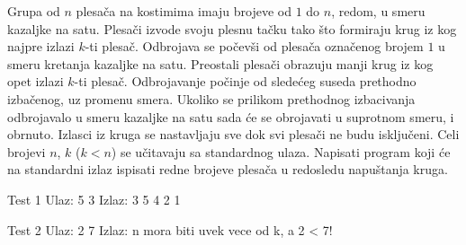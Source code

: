 \begin{Exercise}[label=613]
Grupa od $n$ plesača na kostimima imaju brojeve od $1$ do $n$, redom, u smeru kazaljke na satu.
Plesači izvode svoju plesnu tačku tako što formiraju krug iz kog najpre izlazi $k$-ti plesač.
Odbrojava se počevši od plesača označenog brojem $1$ u smeru kretanja kazaljke na satu. 
Preostali plesači obrazuju manji krug iz kog opet izlazi $k$-ti plesač. Odbrojavanje počinje od
sledećeg suseda prethodno izbačenog, uz promenu smera. Ukoliko se prilikom prethodnog izbacivanja odbrojavalo 
u smeru kazaljke na satu sada će se obrojavati u suprotnom smeru, i obrnuto. Izlasci iz kruga se nastavljaju
sve dok svi plesači ne budu isključeni. 
Celi brojevi $n$, $k$ ($k < n$) se učitavaju sa standardnog ulaza. 
Napisati program koji će na standardni izlaz ispisati redne brojeve plesača u redosledu napuštanja kruga. 

\begin{miditest}
\begin{test}{Test 1}
Ulaz: 
  5 3 
Izlaz: 
  3 5 4 2 1
\end{test}
\end{miditest}
\begin{miditest}
\begin{test}{Test 2}
Ulaz: 
  2 7 
Izlaz: 
  n mora biti uvek vece od k, a 2 < 7!
\end{test}
\end{miditest}

\end{Exercise}
\begin{Answer}[ref=613]
\end{Answer}